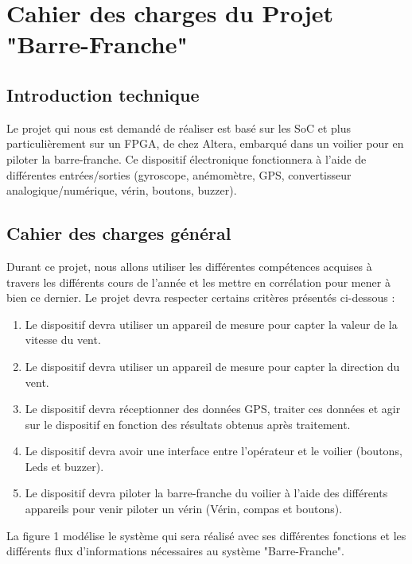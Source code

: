 \section{Cahier des charges du Projet "Barre-Franche"}
\subsection{Introduction technique}
Le projet qui nous est demandé de réaliser est basé sur les SoC et plus particulièrement sur un FPGA, de chez Altera, embarqué dans un voilier pour en piloter la barre-franche.
\newline
Ce dispositif électronique fonctionnera à l'aide de différentes entrées/sorties (gyroscope, anémomètre, GPS, convertisseur analogique/numérique, vérin, boutons, buzzer).
\subsection{Cahier des charges général}
Durant ce projet, nous allons utiliser les différentes compétences acquises à travers les différents cours de l'année et les mettre en corrélation pour mener à bien ce dernier. Le projet devra respecter certains critères présentés ci-dessous :
\begin{enumerate}
    \item   Le dispositif devra utiliser un appareil de mesure pour capter la valeur de la vitesse du vent.
    \item   Le dispositif devra utiliser un appareil de mesure pour capter la direction du vent.
    \item   Le dispositif devra réceptionner des données GPS, traiter ces données et agir sur le dispositif en fonction des résultats obtenus après traitement.
    \item   Le dispositif devra avoir une interface entre l'opérateur et le voilier (boutons, Leds et buzzer).
    \item   Le dispositif devra piloter la barre-franche du voilier à l'aide des différents appareils pour venir piloter un vérin (Vérin, compas et boutons). 
\end{enumerate}\vspace{1cm}
La figure 1 modélise le système qui sera réalisé avec ses différentes fonctions et les différents flux d'informations nécessaires au système "Barre-Franche".
